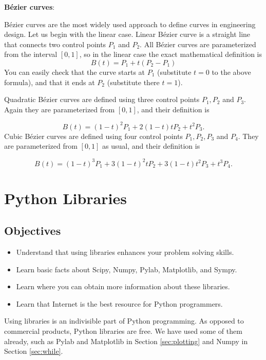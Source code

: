 \noindent
{\bf B\'ezier curves}: 

B\'ezier curves are the most widely used approach to define curves in engineering design. 
Let us begin with the linear case. Linear B\'ezier curve is a straight line that
connects two control points $P_1$ and $P_2$. All B\'ezier curves are parameterized
from the interval $[0, 1]$, so in the linear case the exact mathematical definition is
$$
  B(t) = P_1 + t(P_2 - P_1)
$$ 
You can easily check that the curve starts at $P_1$ (substitute $t = 0$ to the above formula),
and that it ends at $P_2$ (substitute there $t = 1$).

Quadratic B\'ezier curves are defined using three control points $P_1, P_2$ and $P_3$. Again they are
parameterized from $[0, 1]$, and their definition is

$$
  B(t) = (1 - t)^2 P_1 + 2(1 - t)t P_2 + t^2 P_3.
$$ 
Cubic B\'ezier curves are defined using four control points $P_1, P_2, P_3$ and $P_4$. They are
parameterized from $[0, 1]$ as usual, and their definition is

$$
  B(t) = (1 - t)^3 P_1 + 3(1 - t)^2t P_2 + 3(1-t)t^2 P_3 + t^3 P_4.
$$ 


\section{Python Libraries}\label{subsec:importinglib}

\subsection{Objectives}

\begin{itemize}
\item Understand that using libraries enhances your problem solving skills.
\item Learn basic facts about Scipy, Numpy, Pylab, Matplotlib, and Sympy.
\item Learn where you can obtain more information about these libraries.
\item Learn that Internet is the best resource for Python programmers.
\end{itemize}
Using libraries is an indivisible part of Python programming. As opposed to 
commercial products, Python libraries are free. We have used some of them
already, such as Pylab and Matplotlib in Section \ref{sec:plotting} and Numpy 
in Section \ref{sec:while}. 

